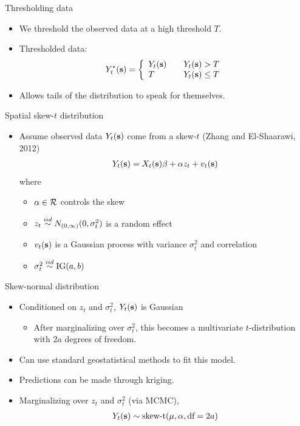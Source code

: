 \documentclass{beamer}
\begin{document}
\begin{frame}{Thresholding data}
  \begin{itemize} \setlength{\itemsep}{0.5em}
    \item We threshold the observed data at a high threshold $T$.
    \item Thresholded data:
    \begin{align*}
      Y_t^*(\mbox{\bf s}) = \left\{ \begin{array}{ll}
          Y_t(\mbox{\bf s}) \quad & Y_t(\mbox{\bf s}) > T\\
          T \quad & Y_t(\mbox{\bf s}) \le T
      \end{array}\right.
    \end{align*}
    \item Allows tails of the distribution to speak for themselves.
  \end{itemize}
\end{frame}

\begin{frame}{Spatial skew-$t$ distribution}
  \begin{itemize} \setlength{\itemsep}{0.5em}
    \item Assume observed data $Y_t(\mbox{\bf s})$ come from a skew-$t$ (Zhang and El-Shaarawi, 2012)
    \begin{align*}
      Y_t(\mbox{\bf s}) = X_t(\mbox{\bf s})\beta + \alpha z_t + v_t(\mbox{\bf s})
    \end{align*}
    where
    \begin{itemize} \setlength{\itemsep}{0.25em}
      \item $\alpha \in {\cal R}$ controls the skew
      \item $z_t \stackrel{iid}{\sim} N_{(0, \infty)}(0, \sigma^2_t)$ is a random effect
      \item $v_t(\mbox{\bf s})$ is a Gaussian process with variance $\sigma^2_t$ and \Matern correlation
      \item $\sigma_t^2 \stackrel{iid}{\sim} \text{IG}(a, b)$
    \end{itemize}
  \end{itemize}
\end{frame}

\begin{frame}{Skew-normal distribution}
  \begin{itemize} \setlength{\itemsep}{0.5em}
    \item Conditioned on $z_t$ and $\sigma^2_t$, $Y_t(\mbox{\bf s})$ is Gaussian
    \begin{itemize}
      \item After marginalizing over $\sigma^2_t$, this becomes a multivariate $t$-distribution with $2a$ degrees of freedom.
    \end{itemize}
    \item Can use standard geostatistical methods to fit this model.
    \item Predictions can be made through kriging.
    \item Marginalizing over $z_t$ and $\sigma^2_t$ (via MCMC),
    \begin{align*}
      Y_t(\mbox{\bf s}) \sim \text{skew-t}(\mu, \alpha, \text{df}=2a)
    \end{align*}
  \end{itemize}
\end{frame}
\end{document}
